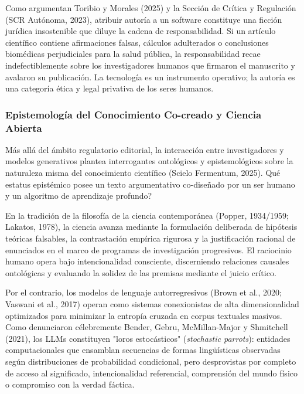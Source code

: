 Como argumentan Toribio y Morales (2025) y la Sección de Crítica y Regulación (SCR Autónoma, 2023), atribuir autoría a un software constituye una ficción jurídica insostenible que diluye la cadena de responsabilidad. Si un artículo científico contiene afirmaciones falsas, cálculos adulterados o conclusiones biomédicas perjudiciales para la salud pública, la responsabilidad recae indefectiblemente sobre los investigadores humanos que firmaron el manuscrito y avalaron su publicación. La tecnología es un instrumento operativo; la autoría es una categoría ética y legal privativa de los seres humanos.

\subsubsection{Epistemología del Conocimiento Co-creado y Ciencia Abierta}

Más allá del ámbito regulatorio editorial, la interacción entre investigadores y modelos generativos plantea interrogantes ontológicos y epistemológicos sobre la naturaleza misma del conocimiento científico (Scielo Fermentum, 2025). \textquestiondown Qué estatus epistémico posee un texto argumentativo co-diseñado por un ser humano y un algoritmo de aprendizaje profundo?

En la tradición de la filosofía de la ciencia contemporánea (Popper, 1934/1959; Lakatos, 1978), la ciencia avanza mediante la formulación deliberada de hipótesis teóricas falsables, la contrastación empírica rigurosa y la justificación racional de enunciados en el marco de programas de investigación progresivos. El raciocinio humano opera bajo intencionalidad consciente, discerniendo relaciones causales ontológicas y evaluando la solidez de las premisas mediante el juicio crítico.

Por el contrario, los modelos de lenguaje autorregresivos (Brown et al., 2020; Vaswani et al., 2017) operan como sistemas conexionistas de alta dimensionalidad optimizados para minimizar la entropía cruzada en corpus textuales masivos. Como denunciaron célebremente Bender, Gebru, McMillan-Major y Shmitchell (2021), los LLMs constituyen "loros estocásticos" (\textit{stochastic parrots}): entidades computacionales que ensamblan secuencias de formas lingüísticas observadas según distribuciones de probabilidad condicional, pero desprovistas por completo de acceso al significado, intencionalidad referencial, comprensión del mundo físico o compromiso con la verdad fáctica.


